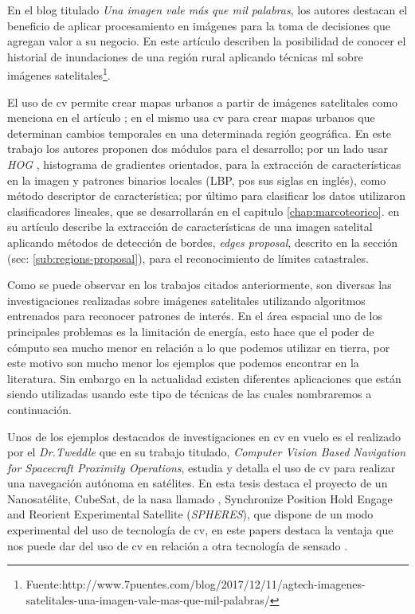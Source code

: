 En el blog titulado \textit{Una imagen vale más que mil palabras}, los autores destacan el beneficio de aplicar procesamiento en imágenes para la toma de decisiones que agregan valor a su negocio. En este artículo describen la posibilidad de conocer el historial de inundaciones de una región rural aplicando técnicas \ac{ml} sobre imágenes satelitales\footnote{Fuente:http://www.7puentes.com/blog/2017/12/11/agtech-imagenes-satelitales-una-imagen-vale-mas-que-mil-palabras/}.

El uso de \ac{cv} permite crear mapas urbanos a partir de imágenes satelitales como menciona en el artículo \citep{detectionHOG}; en el mismo usa \ac{cv} para crear mapas urbanos que determinan cambios temporales en una determinada región geográfica. En este trabajo los autores proponen dos módulos para el desarrollo; por un lado usar \textit{HOG} , histograma de gradientes orientados,\citep{HOG_algoritmo} para la extracción de características en la imagen y patrones binarios locales (LBP, pos sus siglas en inglés)\citep{LBP}, como método descriptor de característica; por último para clasificar los datos utilizaron clasificadores lineales, que se desarrollarán en el capitulo \ref{chap:marcoteorico}. \cite{usman} en su artículo describe la extracción de características de una imagen satelital aplicando métodos de  detección de bordes, \textit{edges proposal}\citep{proposal}, descrito en la sección (sec: \ref{sub:regions-proposal}), para el reconocimiento de límites catastrales.

Como se puede observar en los trabajos citados anteriormente, son diversas las investigaciones realizadas sobre imágenes satelitales utilizando algoritmos entrenados para reconocer patrones de interés. En el área espacial uno de los principales problemas es la limitación de energía, esto hace que el poder de cómputo sea mucho menor en relación a lo que podemos utilizar en tierra, por este motivo son mucho menor los ejemplos que podemos encontrar en la literatura. Sin embargo en la actualidad existen diferentes aplicaciones que están siendo utilizadas usando este tipo de técnicas de las cuales nombraremos a continuación.

Unos de los ejemplos destacados de investigaciones en \ac{cv} en vuelo es el realizado por el \textit{Dr.Tweddle} que en su trabajo titulado, \textit{Computer Vision Based Navigation for Spacecraft Proximity Operations}, estudia y detalla el uso de \ac{cv} para realizar una navegación autónoma en satélites. En esta tesis destaca el proyecto de un Nanosatélite, CubeSat, de la \ac{nasa} llamado , Synchronize Position Hold Engage and Reorient Experimental Satellite (\textit{SPHERES}), que dispone de un modo experimental del uso de tecnología de \ac{cv}, en este papers destaca la ventaja que nos puede dar del uso de \ac{cv} en relación a otra tecnología de sensado \citep{Brent}.

